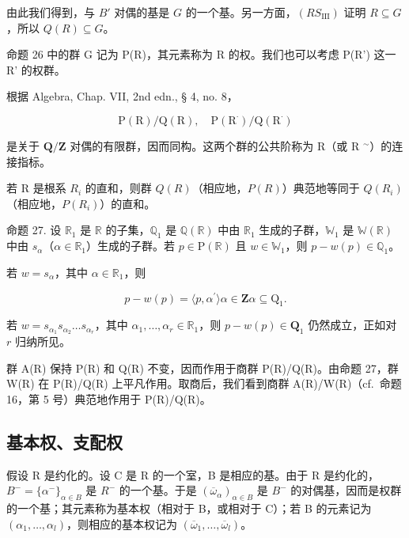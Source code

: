 由此我们得到，与 \(B'\) 对偶的基是 \(G\) 的一个基。另一方面，\((RS_{\mathrm{III}})\) 证明 \(R \subseteq G\)，所以 \(Q(R) \subseteq G\)。

命题 26 中的群 G 记为 P(R)，其元素称为 R 的权。我们也可以考虑 P(R') 这一 R' 的权群。

根据 Algebra, Chap. VII, 2nd edn., § 4, no. 8，

\[
\mathrm{P} (\mathrm{R}) / \mathrm{Q} (\mathrm{R}), \quad \mathrm{P} (\mathrm{R} ^ {\cdot}) / \mathrm{Q} (\mathrm{R} ^ {\cdot})
\]

是关于 \(\mathbf{Q} / \mathbf{Z}\) 对偶的有限群，因而同构。这两个群的公共阶称为 R（或 R \(^{\sim}\)）的连接指标。

若 R 是根系 \(R_{i}\) 的直和，则群 \(Q(R)\)（相应地，\(P(R)\)）典范地等同于 \(Q(R_{i})\)（相应地，\(P(R_{i})\)）的直和。

命题 27. 设 \(\mathbb{R}_1\) 是 \(\mathbb{R}\) 的子集，\(\mathbb{Q}_1\) 是 \(\mathbb{Q}(\mathbb{R})\) 中由 \(\mathbb{R}_1\) 生成的子群，\(\mathbb{W}_1\) 是 \(\mathbb{W}(\mathbb{R})\) 中由 \(s_\alpha\)（\(\alpha \in \mathbb{R}_1\)）生成的子群。若 \(p \in \mathrm{P}(\mathbb{R})\) 且 \(w \in \mathbb{W}_1\)，则 \(p - w(p) \in \mathbb{Q}_1\)。

若 \(w = s_{\alpha}\)，其中 \(\alpha \in \mathbb{R}_1\)，则

\[
p - w (p) = \langle p, \alpha^ {\prime} \rangle \alpha \in \mathbf {Z} \alpha \subseteq \mathrm{Q} _ {1}.
\]

若 \(w = s_{\alpha_1}s_{\alpha_2}\ldots s_{\alpha_r}\)，其中 \(\alpha_{1},\ldots ,\alpha_{r}\in \mathbb{R}_{1}\)，则 \(p - w(p)\in \mathbf{Q}_1\) 仍然成立，正如对 \(r\) 归纳所见。

群 A(R) 保持 P(R) 和 Q(R) 不变，因而作用于商群 P(R)/Q(R)。由命题 27，群 W(R) 在 P(R)/Q(R) 上平凡作用。取商后，我们看到商群 A(R)/W(R)（cf.~命题 16，第 5 号）典范地作用于 P(R)/Q(R)。

\subsection{基本权、支配权}

假设 R 是约化的。设 C 是 R 的一个室，B 是相应的基。由于 R 是约化的，\(B^{-} = \{\alpha^{-}\}_{\alpha \in B}\) 是 \(R^{-}\) 的一个基。于是 \((\overline{\omega}_{\alpha})_{\alpha \in B}\) 是 \(B^{-}\) 的对偶基，因而是权群的一个基；其元素称为基本权（相对于 B，或相对于 C）；若 B 的元素记为 \((\alpha_{1}, \ldots, \alpha_{l})\)，则相应的基本权记为 \((\overline{\omega}_{1}, \ldots, \overline{\omega}_{l})\)。

